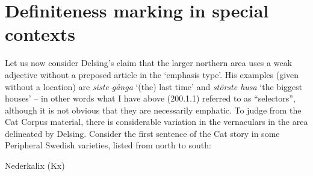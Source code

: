 \section{Definiteness marking in special contexts}

\begin{styleBodyTextFirst}
Let us now consider Delsing’s claim that the larger northern area uses a weak adjective without a preposed article in the ‘emphasis type’. His examples (given without a location) are \textit{siste gånga} ‘(the) last time’ and \textit{störste husa} ‘the biggest houses’ – in other words what I have above (200.1.1) referred to as “selectors”, although it is not obvious that they are necessarily emphatic. To judge from the Cat Corpus material, there is considerable variation in the vernaculars in the area delineated by Delsing. Consider the first sentence of the Cat story in some Peripheral Swedish varieties, listed from north to south:

\end{styleBodyTextFirst}

\begin{listWWNumileveli}
\item {}

\end{listWWNumileveli}

\begin{listWWNumlxxleveli}
\item {}

\begin{styleExLtrTbl}
Nederkalix (Kx)

\end{styleExLtrTbl}

\end{listWWNumlxxleveli}

\begin{styleExText}

\end{styleExText}

